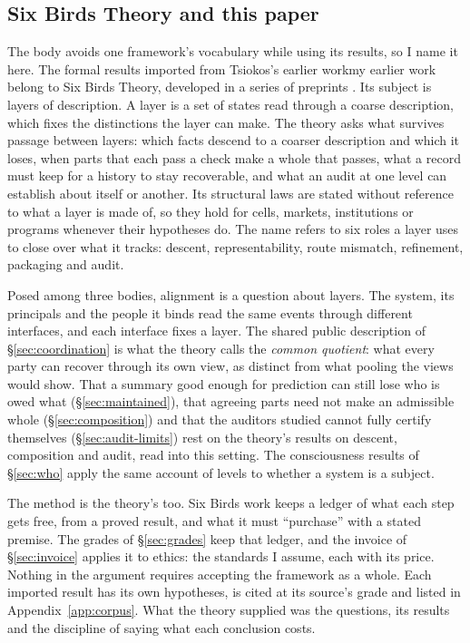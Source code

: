 \documentclass[pdflatex,sn-basic]{sn-jnl}%
\newcommand{\slot}[1]{}%
\newcommand{\enquote}[1]{``#1''}
\newcommand{\renderchoice}[2]{\ifanonymous#2\else#1\fi}%
\begin{document}
\subsection{Six Birds Theory and this paper}\label{sec:sixbirds}

\slot{2.4}%
The body avoids one framework's vocabulary while using its results, so I name it here. The formal results imported from \renderchoice{my earlier work}{Tsiokos's earlier work} belong to Six Birds Theory, developed in a series of preprints \citep{tsiokos2026f1,tsiokos2026f3,tsiokos2026f4}. Its subject is layers of description. A layer is a set of states read through a coarse description, which fixes the distinctions the layer can make. The theory asks what survives passage between layers: which facts descend to a coarser description and which it loses, when parts that each pass a check make a whole that passes, what a record must keep for a history to stay recoverable, and what an audit at one level can establish about itself or another. Its structural laws are stated without reference to what a layer is made of, so they hold for cells, markets, institutions or programs whenever their hypotheses do. The name refers to six roles a layer uses to close over what it tracks: descent, representability, route mismatch, refinement, packaging and audit.

Posed among three bodies, alignment is a question about layers. The system, its principals and the people it binds read the same events through different interfaces, and each interface fixes a layer. The shared public description of \S\ref{sec:coordination} is what the theory calls the \emph{common quotient}: what every party can recover through its own view, as distinct from what pooling the views would show. That a summary good enough for prediction can still lose who is owed what (\S\ref{sec:maintained}), that agreeing parts need not make an admissible whole (\S\ref{sec:composition}) and that the auditors studied cannot fully certify themselves (\S\ref{sec:audit-limits}) rest on the theory's results on descent, composition and audit, read into this setting. The consciousness results of \S\ref{sec:who} apply the same account of levels to whether a system is a subject.

The method is the theory's too. Six Birds work keeps a ledger of what each step gets free, from a proved result, and what it must \enquote{purchase} with a stated premise. The grades of \S\ref{sec:grades} keep that ledger, and the invoice of \S\ref{sec:invoice} applies it to ethics: the standards I assume, each with its price. Nothing in the argument requires accepting the framework as a whole. Each imported result has its own hypotheses, is cited at its source's grade and listed in Appendix~\ref{app:corpus}. What the theory supplied was the questions, its results and the discipline of saying what each conclusion costs.
\end{document}
